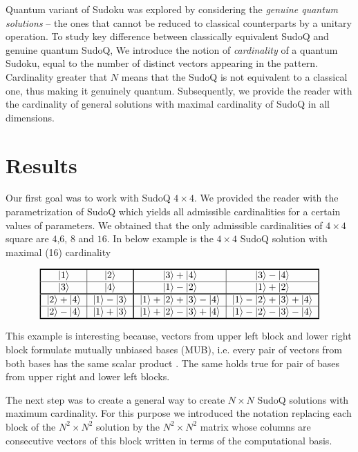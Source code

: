 \documentclass[11pt]{article}
\begin{document}
Quantum variant of Sudoku was explored by considering the \emph{genuine quantum solutions} – the ones that cannot be reduced to classical counterparts by a unitary operation. 
To study key difference between classically equivalent SudoQ and genuine quantum SudoQ, We introduce the notion of \emph{cardinality} of a quantum Sudoku, equal to the number of distinct vectors appearing in the pattern. Cardinality greater that $N$ means that the SudoQ is not equivalent to a classical one, thus making it genuinely quantum. Subsequently, we provide the reader with the cardinality of general solutions with maximal cardinality of SudoQ in all dimensions. 


\section{Results}
Our first goal was to work with SudoQ $4 \times 4$. We provided the reader with the parametrization of SudoQ which yields all admissible cardinalities for a certain values of parameters. We obtained that the only admissible cardinalities of $4 \times 4$ square are $4$,$6$, $8$ and $16$.
In below example is the $4 \times 4$ SudoQ solution with maximal (16) cardinality
\begin{example}{}\label{ex:4x4_card16}
\[
 \begin{tabular}{!{\vrule width 1pt}c|c!{\vrule width 1pt}c|c!{\vrule width 1pt}}
    \noalign{\hrule height 1pt}
    $\ket{1}$ & $\ket{2}$ & $\ket{3}+\ket{4}$ & $\ket{3}-\ket{4}$ \tabularnewline
    \hline
    $\ket{3}$ & $\ket{4}$ & $\ket{1}-\ket{2}$ & $\ket{1}+\ket{2}$ \tabularnewline
    \noalign{\hrule height 1pt}
    $\ket{2}+\ket{4}$ & $\ket{1}-\ket{3}$ & $\ket{1}+\ket{2}+\ket{3}-\ket{4}$ & $\ket{1}-\ket{2}+\ket{3}+\ket{4}$ \tabularnewline
    \hline
    $\ket{2}-\ket{4}$ & $\ket{1}+\ket{3}$ & $\ket{1}+\ket{2}-\ket{3}+\ket{4}$ & $\ket{1}-\ket{2}-\ket{3}-\ket{4}$ \tabularnewline
    \noalign{\hrule height 1pt}
\end{tabular}
\]
\end{example}

This example is interesting because, vectors from upper left block and lower right block formulate mutually unbiased bases (MUB), i.e. every pair of vectors from both bases has the same scalar product \cite{Ivonovic_1981,Wooters_1989}. The same holds true for pair of bases from upper right and lower left blocks.


The next step was to create a general way to create $N \times N$ SudoQ solutions with maximum cardinality. For this purpose we introduced the notation replacing each block of the $N^2\times N^2$ solution by the $N^2\times N^2$ matrix whose columns are consecutive vectors of this block written in terms of the computational basis. 
\end{document}
